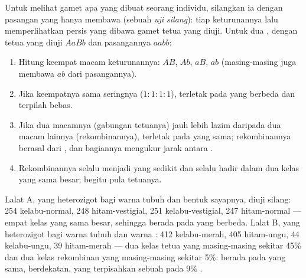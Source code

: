 \begin{method}\label{met:g12:meiosis-genetic-shuffling:testcross}
Untuk melihat gamet apa yang dibuat seorang individu, silangkan ia
dengan pasangan yang hanya membawa   (sebuah \emph{uji
silang}): tiap keturunannya lalu memperlihatkan persis  yang dibawa
gamet tetua yang diuji. Untuk dua , dengan tetua yang diuji $AaBb$
dan pasangannya $aabb$:
\begin{enumerate}
  \item Hitung keempat macam keturunannya: $AB$, $Ab$, $aB$, $ab$
        (masing-masing juga membawa $ab$ dari pasangannya).
  \item Jika keempatnya sama seringnya ($1:1:1:1$),  terletak
        pada  yang berbeda dan terpilah bebas.
  \item Jika dua macamnya (gabungan tetuanya) jauh lebih lazim daripada
        dua macam lainnya (rekombinannya),  terletak pada
         yang sama; rekombinannya berasal dari ,
        dan bagiannya mengukur jarak antara .
  \item Rekombinannya selalu menjadi yang sedikit dan selalu hadir
        dalam dua kelas yang sama besar; begitu pula tetuanya.
\end{enumerate}
\end{method}

\begin{example}\label{ex:g12:meiosis-genetic-shuffling:fly}
Lalat A, yang heterozigot bagi warna tubuh dan bentuk sayapnya, diuji
silang: 254 kelabu-normal, 248 hitam-vestigial, 251 kelabu-vestigial,
247 hitam-normal --- empat kelas yang sama besar, sehingga 
berada pada  yang berbeda. Lalat B, yang heterozigot bagi warna
tubuh dan warna : 412 kelabu-merah, 405 hitam-ungu, 44
kelabu-ungu, 39 hitam-merah --- dua kelas tetua yang masing-masing
sekitar 45\% dan dua kelas rekombinan yang masing-masing sekitar 5\%:
 berada pada  yang sama, berdekatan, yang terpisahkan
sebuah  pada 9\% .
\end{example}

